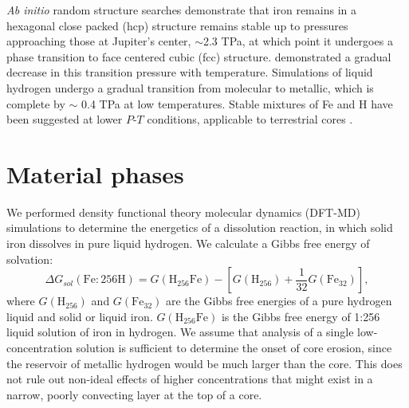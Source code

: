 {\it Ab initio} random structure searches
\citep{Pickard2009} demonstrate that iron remains in a hexagonal close packed (hcp) structure
remains stable up to pressures approaching those at Jupiter's center, $\sim$2.3 TPa, at
which point it undergoes a phase transition to face centered cubic (fcc)
structure. \citet{stixrude2012} demonstrated a gradual decrease in this transition
pressure with temperature. Simulations of liquid hydrogen
\citep{Militzer2008,militzer2013a,Mcmahon2012} undergo a gradual transition from molecular to
metallic, which is complete by $\sim$ 0.4 TPa at low temperatures.  Stable
mixtures of Fe and H have been suggested at lower $P$-$T$ conditions,
applicable to terrestrial cores \citep{Bazhanova2012}. 

\section{Material phases}

We performed density functional theory molecular dynamics (DFT-MD) simulations
to determine the energetics of a dissolution reaction, in which solid iron
dissolves in pure liquid hydrogen. We calculate a Gibbs free energy of
solvation:
\begin{equation} \label{feh_gibbs}
  \Delta G_{sol}\left(\mathrm{Fe}:256\mathrm{H}\right) = G\left(\mathrm{H}_{256}\mathrm{Fe}\right) -
  \left[ G\left(\mathrm{H}_{256}\right) +
    \frac{1}{32}G\left(\mathrm{Fe}_{32}\right) \right]\mathrm{,}
\end{equation}
where $G\left(\mathrm{H}_{256}\right)$ and $G\left(\mathrm{Fe}_{32}\right)$
are the Gibbs free
energies of a pure hydrogen liquid and solid or liquid iron.
$G\left(\mathrm{H}_{256}\mathrm{Fe}\right)$ is the Gibbs free energy of 1:256 liquid solution of iron
in hydrogen. We assume that analysis of a single low-concentration solution is
sufficient to determine the onset of core erosion, since the reservoir of
metallic hydrogen would be much larger than the core. This does not rule out
non-ideal effects of higher concentrations that might exist in a narrow,
poorly convecting layer at the top of a core. 


